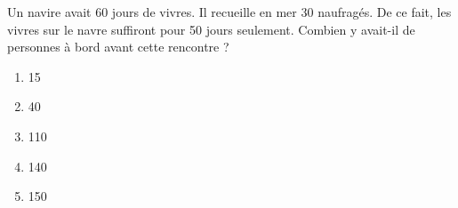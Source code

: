 Un navire avait 60 jours de vivres. Il recueille en mer 30 naufragés. De ce fait, les vivres sur le navre suffiront pour 50 jours seulement. Combien y avait-il de personnes à bord avant cette rencontre ?
\begin{multicols}{5}
  \begin{enumerate}[A/]
  \item 15
  \item 40
  \item 110
  \item 140
  \item 150
  \end{enumerate}
\end{multicols}